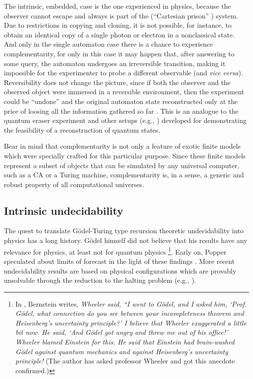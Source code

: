 \documentclass[pre,preprint,showpacs,showkeys,amsfonts]{revtex4}
\begin{document}
The intrinsic, embedded, case is the one experienced in physics,
because the observer cannot escape and always is part of the
(``Cartesian prison'' \cite[Meditation 5,15]{descartes-meditation}) system.
Due to restrictions in copying and cloning, it is not possible, for
instance, to obtain an identical copy of a single photon or electron in a nonclassical state.
And only in the single automaton case there is a chance to experience complementarity,
for only in this case it may happen that, after answering to some
query, the automaton undergoes an irreversible transition,
making it impossible for the experimenter to probe a different observable (and {\it vice versa}).
Reversibility does not change the picture, since if both the
observer and the observed object were immersed in a reversible environment,
then the experiment could be ``undone'' and
the original automaton state reconstructed only at the price of loosing
all the information gathered so far \cite{svozil-2000interface}.
This is an analogue to the quantum eraser experiment \cite{hkwz} and
other setups (e.g., \cite{greenberger2}) developed for demonstrating the
feasibility of a
reconstruction of quantum states.

Bear in mind that complementarity is not only a feature of exotic finite models which were
specially crafted for this particular purpose.
Since these finite models represent a subset of objects that  can be
simulated by any universal computer, such as a CA or a Turing machine,
complementarity is, in a sense, a generic
and robust property of all computational universes.


\subsection{Intrinsic undecidability}

The quest to translate G\"odel-Turing type recursion theoretic undecidability into physics
has a long history.
G\"odel himself did not believe that his results have any relevance for physics,
at least not for quantum physics
\footnote{In
 \cite[140-141]{bernstein}, Bernstein writes,
{\it Wheeler said, ``I went to G\"odel, and I asked him,
`Prof. G\"odel, what connection do you see between your incompleteness
theorem and Heisenberg's uncertainty principle?'
I believe that Wheeler exaggerated a little bit now.
He said, `And G\"odel got angry and threw me out of his office!'
Wheeler blamed Einstein for this. He said that Einstein had
brain-washed G\"odel against quantum mechanics and against Heisenberg's uncertainty principle!}
(The author has asked professor Wheeler and got this anecdote confirmed.)
}.
Early on,  Popper speculated about limits of forecast in the light
of these findings \cite{popper-50}.
More recent undecidability results are based on physical configurations
which are provably unsolvable through the reduction
to the halting problem (e.g., \cite{komar,kanter,moore}).
\end{document}
